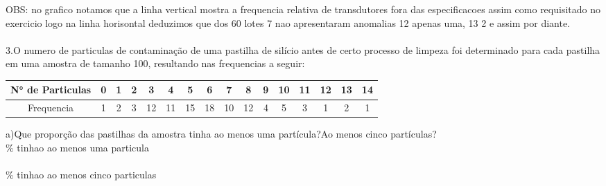 \documentclass[12pt]{article}%
\begin{document}
\begin{center}
\end{center}
OBS: no grafico notamos que a linha vertical mostra a frequencia relativa de transdutores fora das especificacoes assim como requisitado no exercicio logo na linha horisontal deduzimos que dos 60 lotes 7 nao apresentaram anomalias 12 apenas uma, 13 2 e assim por diante.
\\\\
 3.O numero de particulas de contaminação de uma pastilha de silício antes de certo
 processo de limpeza foi determinado para cada pastilha em uma amostra de tamanho
 100, resultando nas frequencias a seguir:
 \begin{center}
     \begin{tabular}{c|c|c|c|c|c|c|c|c|c|c|c|c|c|c|c}
     \hline
         N° de Particulas & 0 & 1 & 2 & 3&4&5&6&7&8&9&10&11&12&13&14 \\\hline
         Frequencia & 1&2&3&12&11&15&18&10&12&4&5&3&1&2&1\\\hline
     \end{tabular}
 \end{center}
 a)Que proporção das pastilhas da amostra tinha ao menos uma partícula?Ao menos cinco partículas?
 \\\pgfmathresult\% tinhao ao menos uma particula\\  \\\pgfmathresult\% tinhao ao menos cinco particulas
\end{document}
